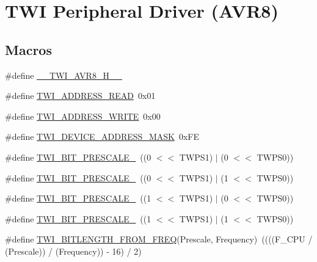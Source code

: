 \hypertarget{group__Group__TWI__AVR8}{}\section{T\+WI Peripheral Driver (A\+V\+R8)}
\label{group__Group__TWI__AVR8}
\subsection*{Macros}
\begin{DoxyCompactItemize}
\item 
\#define \hyperlink{group__Group__TWI__AVR8_gaed9e1e1d80a4dd73f43f91ebee131031}{\+\_\+\+\_\+\+T\+W\+I\+\_\+\+A\+V\+R8\+\_\+\+H\+\_\+\+\_\+}
\item 
\#define \hyperlink{group__Group__TWI__AVR8_gafdb1cc962976222df2cbc04641721578}{T\+W\+I\+\_\+\+A\+D\+D\+R\+E\+S\+S\+\_\+\+R\+E\+AD}~0x01
\item 
\#define \hyperlink{group__Group__TWI__AVR8_gaa2e5a453a4ef4b0c5fe8b96df1c8389f}{T\+W\+I\+\_\+\+A\+D\+D\+R\+E\+S\+S\+\_\+\+W\+R\+I\+TE}~0x00
\item 
\#define \hyperlink{group__Group__TWI__AVR8_ga035ba93ded6691ea12f11a99bec8fca2}{T\+W\+I\+\_\+\+D\+E\+V\+I\+C\+E\+\_\+\+A\+D\+D\+R\+E\+S\+S\+\_\+\+M\+A\+SK}~0x\+FE
\item 
\#define \hyperlink{group__Group__TWI__AVR8_ga66bdf320ad96921bf13c90352bdd5a9a}{T\+W\+I\+\_\+\+B\+I\+T\+\_\+\+P\+R\+E\+S\+C\+A\+L\+E\+\_}~((0 $<$$<$ T\+W\+P\+S1) $\vert$ (0 $<$$<$ T\+W\+P\+S0))
\item 
\#define \hyperlink{group__Group__TWI__AVR8_gaa66fd4788095ee03a24bb65fa65ccc5b}{T\+W\+I\+\_\+\+B\+I\+T\+\_\+\+P\+R\+E\+S\+C\+A\+L\+E\+\_}~((0 $<$$<$ T\+W\+P\+S1) $\vert$ (1 $<$$<$ T\+W\+P\+S0))
\item 
\#define \hyperlink{group__Group__TWI__AVR8_ga215532624ce3ebbe9298dbb8a2b77b14}{T\+W\+I\+\_\+\+B\+I\+T\+\_\+\+P\+R\+E\+S\+C\+A\+L\+E\+\_}~((1 $<$$<$ T\+W\+P\+S1) $\vert$ (0 $<$$<$ T\+W\+P\+S0))
\item 
\#define \hyperlink{group__Group__TWI__AVR8_ga1bf676344c39a2f32822034648295ad1}{T\+W\+I\+\_\+\+B\+I\+T\+\_\+\+P\+R\+E\+S\+C\+A\+L\+E\+\_}~((1 $<$$<$ T\+W\+P\+S1) $\vert$ (1 $<$$<$ T\+W\+P\+S0))
\item 
\#define \hyperlink{group__Group__TWI__AVR8_ga4761abd051f4daf7da07f886bf6df770}{T\+W\+I\+\_\+\+B\+I\+T\+L\+E\+N\+G\+T\+H\+\_\+\+F\+R\+O\+M\+\_\+\+F\+R\+EQ}(Prescale,  Frequency)~((((F\+\_\+\+C\+PU / (Prescale)) / (Frequency)) -\/ 16) / 2)
\end{DoxyCompactItemize}
